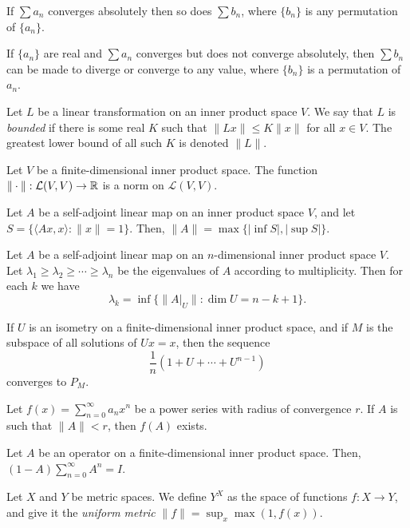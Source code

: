 \begin{prop}
    If $\sum a_n$ converges absolutely then so does $\sum b_n$, where $\{b_n\}$
    is any permutation of $\{a_n\}$.
\end{prop}
\begin{prop}
    If $\{a_n\}$ are real and $\sum a_n$ converges but does not converge
    absolutely, then $\sum b_n$
    can be made to diverge or converge to any value, where $\{b_n\}$ is a
    permutation of $a_n$.
\end{prop}
\begin{defn}
  Let $L$ be a linear transformation on an inner product space $V$. We say that
  $L$ is \emph{bounded} if there is some real $K$ such that $\|Lx\|\le K\|x\|$
  for all $x\in V$. The greatest lower bound of all such $K$ is denoted $\|L\|$.
\end{defn}
\begin{prop}
  Let $V$ be a finite-dimensional inner product space. The function
  $\|\cdot\|:\mathcal L(V,V)\to\mathbb{R}$ is a norm on $\mathcal L(V,V)$.
\end{prop}
\begin{prop}
  Let $A$ be a self-adjoint linear map on an inner product space $V$, and let
  $S=\{\langle Ax,x\rangle:\|x\|=1\}$. Then, $\|A\|=\max\{|\inf S|,|\sup
  S|\}$.
\end{prop}
\begin{prop}
  Let $A$ be a self-adjoint linear map on an $n$-dimensional inner product space
  $V$. Let $\lambda_1\ge\lambda_2\ge\cdots\ge\lambda_n$ be the eigenvalues of
  $A$ according to multiplicity. Then for each $k$ we have
  \[\lambda_k=\inf\{\|A|_U\|:\dim U=n-k+1\}.\]
\end{prop}
\begin{thm}
  If $U$ is an isometry on a finite-dimensional inner product space, and if $M$
  is the subspace of all solutions of $Ux=x$, then the sequence
  \[\frac1n(1+U+\cdots+U^{n-1})\] converges to $P_M$.
\end{thm}
\begin{prop}
  Let $f(x)=\sum_{n=0}^\infty a_n x^n$ be a power series with radius of
  convergence $r$. If $A$ is such that $\|A\|<r$, then $f(A)$ exists.
\end{prop}
\begin{prop}
  Let $A$ be an operator on a finite-dimensional inner product space. Then,
  $(1-A)\sum_{n=0}^\infty A^n=I$.
\end{prop}
\begin{defn}
    Let $X$ and $Y$ be metric spaces. We define $Y^X$ as the space of
    functions $f:X\to Y$, and give it the \emph{uniform metric}
    $\|f\|=\sup_x\max(1,f(x))$.
\end{defn}
